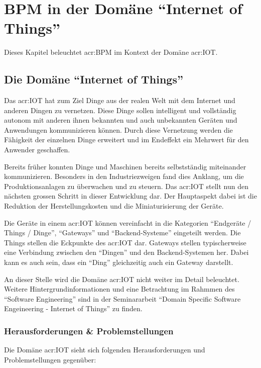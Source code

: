
\chapter{BPM in der Domäne "`Internet of Things"'}
Dieses Kapitel beleuchtet \gls{acr:BPM} im Kontext der Domäne \gls{acr:IOT}.

\section{Die Domäne "`Internet of Things"'}
Das \gls{acr:IOT} hat zum Ziel Dinge aus der realen Welt mit dem Internet und anderen Dingen zu vernetzen. Diese Dinge sollen intelligent und vollständig autonom mit anderen ihnen bekannten und auch unbekannten Geräten und Anwendungen kommunizieren können. Durch diese Vernetzung werden die Fähigkeit der einzelnen Dinge erweitert und im Endeffekt ein Mehrwert für den Anwender geschaffen.

Bereits früher konnten Dinge und Maschinen bereits selbstständig miteinander kommunizieren. Besonders in den Industriezweigen fand dies Anklang, um die Produktionsanlagen zu überwachen und zu steuern. Das \gls{acr:IOT} stellt nun den nächsten grossen Schritt in dieser Entwicklung dar. Der Hauptaspekt dabei ist die Reduktion der Herstellungskosten und die Miniaturisierung der Geräte.

Die Geräte in einem \gls{acr:IOT} können vereinfacht in die Kategorien "`Endgeräte / Things / Dinge"', "`Gateways"' und "`Backend-Systeme"' eingeteilt werden. Die Things stellen die Eckpunkte des \gls{acr:IOT} dar. Gateways stellen typischerweise eine Verbindung zwischen den "`Dingen"' und den Backend-Systemen her. Dabei kann es auch sein, dass ein "`Ding"' gleichzeitig auch ein Gateway darstellt.

An dieser Stelle wird die Domäne \gls{acr:IOT} nicht weiter im Detail beleuchtet. Weitere Hintergrundinformationen und eine Betrachtung im Rahmmen des "`Software Engineering"' sind in der Seminararbeit "`Domain Specific Software Engeineering - Internet of Things"' \cite{E:DBRU:SEM:IOT} zu finden.

\subsection{Herausforderungen \& Problemstellungen}\label{sec:AnalyseIot:ChallangesAndProblems}
Die Domäne \gls{acr:IOT} sieht sich folgenden Herausforderungen und Problemstellungen gegenüber:

